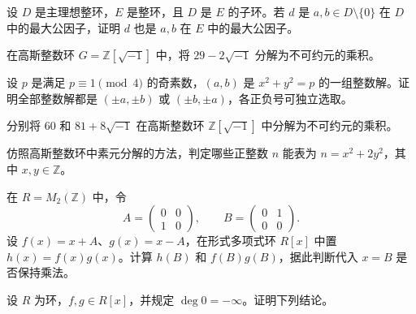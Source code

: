 \newpage
\noindent\begin{minipage}{\textwidth}
设 $D$ 是主理想整环，$E$ 是整环，且 $D$ 是 $E$ 的子环。若 $d$ 是 $a,b\in D\setminus\{0\}$ 在 $D$ 中的最大公因子，证明 $d$ 也是 $a,b$ 在 $E$ 中的最大公因子。
\end{minipage}\par\vfill
\noindent\begin{minipage}{\textwidth}
在高斯整数环 $G=\mathbb{Z}[\sqrt{-1}]$ 中，将 $29-2\sqrt{-1}$ 分解为不可约元的乘积。
\end{minipage}\par\vfill
\noindent\begin{minipage}{\textwidth}
设 $p$ 是满足 $p\equiv1\pmod 4$ 的奇素数，$(a,b)$ 是 $x^2+y^2=p$ 的一组整数解。证明全部整数解都是 $(\pm a,\pm b)$ 或 $(\pm b,\pm a)$，各正负号可独立选取。
\end{minipage}\par\vfill
\newpage
\noindent\begin{minipage}{\textwidth}
分别将 $60$ 和 $81+8\sqrt{-1}$ 在高斯整数环 $\mathbb{Z}[\sqrt{-1}]$ 中分解为不可约元的乘积。
\end{minipage}\par\vfill
\noindent\begin{minipage}{\textwidth}
仿照高斯整数环中素元分解的方法，判定哪些正整数 $n$ 能表为 $n=x^2+2y^2$，其中 $x,y\in\mathbb{Z}$。
\end{minipage}\par\vfill
\noindent\begin{minipage}{\textwidth}
在 $R=M_2(\mathbb{Z})$ 中，令
\[
A=\begin{pmatrix}0&0\\1&0\end{pmatrix},\qquad
B=\begin{pmatrix}0&1\\0&0\end{pmatrix}.
\]
设 $f(x)=x+A$、$g(x)=x-A$，在形式多项式环 $R[x]$ 中置 $h(x)=f(x)g(x)$。计算 $h(B)$ 和 $f(B)g(B)$，据此判断代入 $x=B$ 是否保持乘法。
\end{minipage}\par\vfill
\newpage
\noindent\begin{minipage}{\textwidth}
设 $R$ 为环，$f,g\in R[x]$，并规定 $\deg 0=-\infty$。证明下列结论。
\end{minipage}\par\vfill

